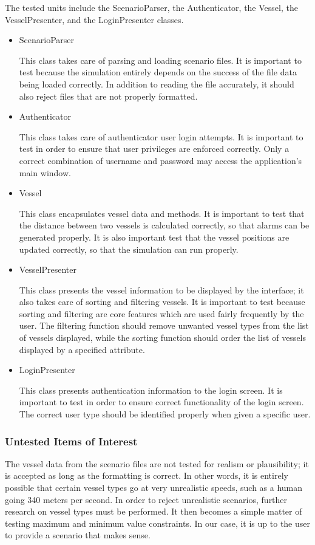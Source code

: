\documentclass[12pt]{article}
\begin{document}
The tested units include the ScenarioParser, the Authenticator, the Vessel, the VesselPresenter, and the LoginPresenter classes.
\begin{itemize}
\item ScenarioParser\par
This class takes care of parsing and loading scenario files. It is important to test because the simulation entirely depends on the success of the file data being loaded correctly. In addition to reading the file accurately, it should also reject files that are not properly formatted.
\item Authenticator\par
This class takes care of authenticator user login attempts. It is important to test in order to ensure that user privileges are enforced correctly. Only a correct combination of username and password may access the application's main window.  
\item Vessel\par
This class encapsulates vessel data and methods. It is important to test that the distance between two vessels is calculated correctly, so that alarms can be generated properly. It is also important test that the vessel positions are updated correctly, so that the simulation can run properly.
\item VesselPresenter\par
This class presents the vessel information to be displayed by the interface; it also takes care of sorting and filtering vessels. It is important to test because sorting and filtering are core features which are used fairly frequently by the user. The filtering function should remove unwanted vessel types from the list of vessels displayed, while the sorting function should order the list of vessels displayed by a specified attribute.
\item LoginPresenter\par
This class presents authentication information to the login screen. It is important to test in order to ensure correct functionality of the login screen. The correct user type should be identified properly when given a specific user.
\end{itemize}


\subsubsection{Untested Items of Interest}
The vessel data from the scenario files are not tested for realism or plausibility; it is accepted as long as the formatting is correct. In other words, it is entirely possible that certain vessel types go at very unrealistic speeds, such as a human going 340 meters per second. In order to reject unrealistic scenarios, further research on vessel types must be performed. It then becomes a simple matter of testing maximum and minimum value constraints. In our case, it is up to the user to provide a scenario that makes sense.
\end{document}

